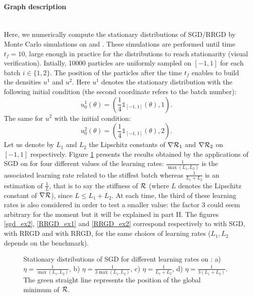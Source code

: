 \paragraph{Graph description}
~~\\
Here, we numerically compute the stationary distributions of SGD/RRGD by Monte Carlo simulations on \exOne and \exTwo. These simulations are performed until time $t_f=10$, large
enough in practice for the distributions to reach stationarity (visual verification). Intially, 10000 particles are uniformly sampled on $[-1,1]$ for each batch $i\in \{1,2\}$. The position of the particles after the time $t_f$ enables to build the densities $u^1$ and $u^2$. Here $u^1$ denotes the stationary distribution with the following initial condition (the second coordinate refers to the batch number):
\begin{equation*}
	u^1_0(\theta) = \left(\frac{1}{4} \mathds{1}_{[-1,1]}(\theta),1\right).
\end{equation*}
The same for $u^2$ with the initial condition:
\begin{equation*}
	u^2_0(\theta) = \left(\frac{1}{4} \mathds{1}_{[-1,1]}(\theta),2\right).
\end{equation*}
Let us denote by $L_1$ and $L_2$ the Lipschitz constants of $\nabla \mathcal{R}_1$ and $\nabla \mathcal{R}_2$ on $[-1,1]$ respectively. Figure \ref{sgd_ex1} presents the results obtained by the applications of SGD on \exOne
for four different values of the learning rates: $\frac{1}{\max(L_1,L_2)}$ is the associated learning rate related to the stiffest batch whereas $\frac{1}{L_1+L_2}$ is an estimation of
$\frac{1}{L}$, that is to say the stiffness of $\mathcal{R}$ (where $L$ denotes the Lipschitz constant of $\nabla \mathcal{R}$), since $L \leq L_1+L_2$. At each time, the third of these learning rates is also
considered in order to test a smaller value: the factor 3 could seem arbitrary for the moment but it will be explained in part II. The figures
\ref{sgd_ex2}, \ref{RRGD_ex1} and \ref{RRGD_ex2} correspond respectively to \exTwo with SGD, \exOne with RRGD and \exTwo with RRGD, for the same choices of learning rates ($L_1,L_2$ depends on the benchmark). 

\begin{figure}[!h]
	\centering
	\scalebox{0.45}{}
	\caption{Stationary distributions of SGD for different learning rates on \exOne: a) $\eta=\frac{1}{\max(L_1,L_2)}$, b) $\eta=\frac{1}{3\max(L_1,L_2)}$, c) $\eta=\frac{1}{L_1+L_2}$, d) $\eta=\frac{1}{3(L_1+L_2)}$. The green straight line represents the position of the global minimum of $\mathcal{R}$.}
	\label{sgd_ex1}
\end{figure}

